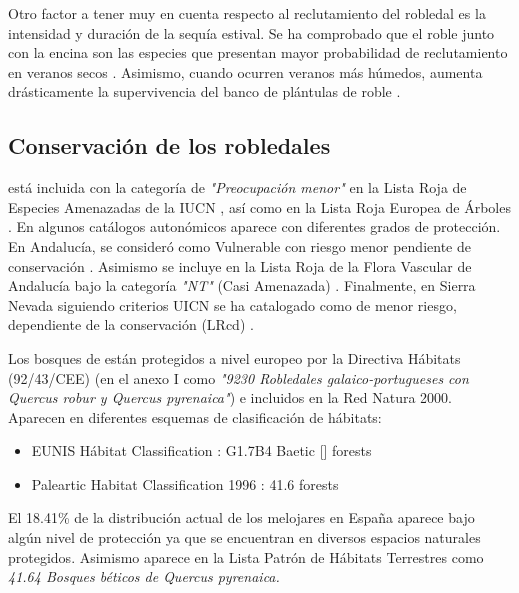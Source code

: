 Otro factor a tener muy en cuenta respecto al reclutamiento del robledal es la intensidad y duración de la sequía estival. Se ha comprobado que el roble junto con la encina son las especies que presentan mayor probabilidad de reclutamiento en veranos secos \autocites{Mendozaetal2009SeedingExperiment}. Asimismo, cuando ocurren veranos más húmedos, aumenta drásticamente la supervivencia del banco de plántulas de roble \autocites{Mendozaetal2009SeedingExperiment}. 

\subsection{Conservación de los robledales}\label{sec:intro:conservation}

\Qp está incluida con la categoría de \emph{"Preocupación menor"} en la Lista Roja de Especies Amenazadas de la IUCN \autocites{Goreneretal2017QuercusPyrenaica}, así como en la Lista Roja Europea de Árboles \autocites{Riversetal2019EuropeanRed}. En algunos catálogos autonómicos aparece con diferentes grados de protección. En Andalucía, se consideró como Vulnerable con riesgo menor pendiente de conservación \autocites{Viveroetal2000QuercusPyrenaica}. Asimismo se incluye en la Lista Roja de la Flora Vascular de Andalucía bajo la categoría \emph{"NT"} (Casi Amenazada) \autocites{Cabezudoetal2005ListaRoja}. Finalmente, en Sierra Nevada siguiendo criterios UICN se ha catalogado como de menor riesgo, dependiente de la conservación (LRcd) \autocites{Blancaetal1998ThreatenedVascular,Blancaetal2001VegetacionSierra, Lorite2016UpdatedChecklist, Loriteetal2007EstimationThreatened}. 

Los bosques de \Qp están protegidos a nivel europeo por la Directiva Hábitats (92/43/CEE) (en el anexo I como \emph{"9230 Robledales galaico-portugueses con Quercus robur y Quercus pyrenaica"}) e incluidos en la Red Natura 2000. Aparecen en diferentes esquemas de clasificación de hábitats:

\begin{itemize}
\item EUNIS Hábitat Classification \autocites{Daviesetal2004EUNISHabitat}: G1.7B4 Baetic [\Qpy] forests
\item Paleartic Habitat Classification 1996 \autocite{DevillersDevillersTerschuren1998ClassificationPalearctic}: 41.6 \Qpy forests 
\end{itemize}

El 18.41\% de la distribución actual de los melojares en España aparece bajo algún nivel de protección ya que se encuentran en diversos espacios naturales protegidos. Asimismo aparece en la Lista Patrón de Hábitats Terrestres como \emph{41.64 Bosques béticos de Quercus pyrenaica.}


